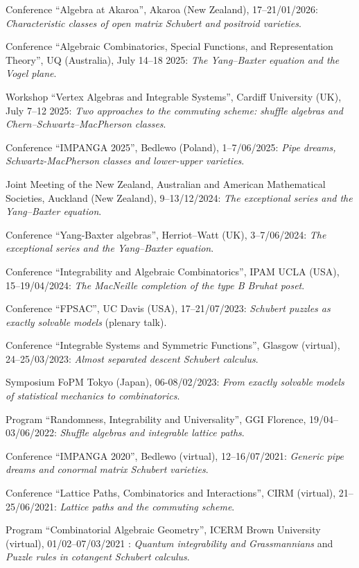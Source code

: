 \s Conference ``Algebra at Akaroa'', Akaroa (New Zealand), 17--21/01/2026: {\sl Characteristic classes of open matrix Schubert and positroid varieties}.

\s Conference ``Algebraic Combinatorics,  Special Functions, and Representation Theory'', UQ (Australia), July 14--18 2025: {\sl The Yang--Baxter equation and the Vogel plane}.

\s Workshop ``Vertex Algebras and Integrable Systems'', Cardiff University (UK), July 7--12 2025: {\sl Two approaches to the commuting scheme: shuffle algebras and Chern--Schwartz--MacPherson classes}.

\s Conference ``IMPANGA 2025'', Bedlewo (Poland), 1--7/06/2025: {\sl Pipe dreams, Schwartz-MacPherson classes and lower-upper varieties}.

\s Joint Meeting of the New Zealand, Australian and American Mathematical Societies, Auckland (New Zealand),
9--13/12/2024: {\sl The exceptional series and the Yang--Baxter equation}.

\s Conference ``Yang-Baxter algebras'', Herriot--Watt (UK), 3--7/06/2024: {\sl The exceptional series and the Yang--Baxter equation}.

\s Conference ``Integrability and Algebraic Combinatorics'', IPAM UCLA (USA), 15--19/04/2024: {\sl The MacNeille completion of the type B Bruhat poset}. 

\s Conference ``FPSAC'', UC Davis (USA), 17--21/07/2023: {\sl Schubert puzzles as exactly solvable models} (plenary talk).

\s Conference ``Integrable Systems and Symmetric Functions'', Glasgow (virtual), 24--25/03/2023: {\sl Almost separated descent Schubert calculus}.

\s Symposium FoPM Tokyo (Japan), 06-08/02/2023: {\sl From exactly solvable models of statistical mechanics to combinatorics}.

\s Program ``Randomness, Integrability and Universality'', GGI Florence, 19/04--03/06/2022: {\sl Shuffle algebras and integrable lattice paths}.

\s Conference ``IMPANGA 2020'', Bedlewo (virtual), 12--16/07/2021: {\sl Generic pipe dreams and conormal matrix Schubert varieties}.

\s Conference ``Lattice Paths, Combinatorics and Interactions'', CIRM (virtual), 21--25/06/2021: {\sl Lattice paths and the commuting scheme}.

\s Program ``Combinatorial Algebraic Geometry'', ICERM Brown University (virtual), 01/02--07/03/2021 : {\sl Quantum integrability and Grassmannians} and {\sl Puzzle rules in cotangent Schubert calculus}.

